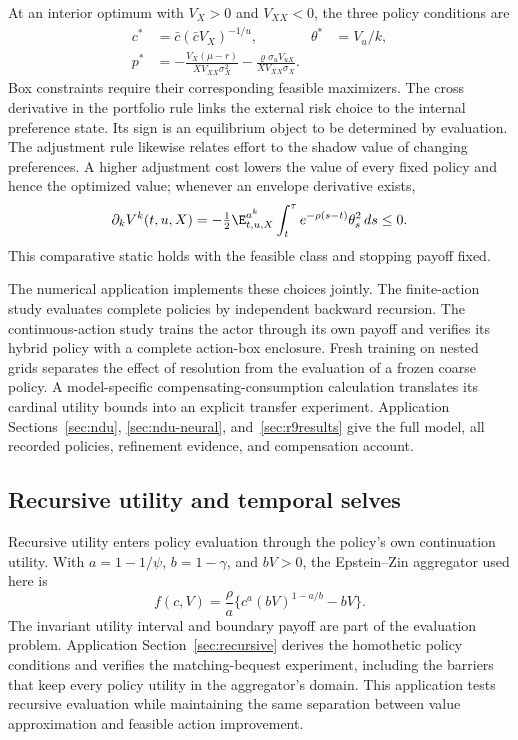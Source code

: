 At an interior optimum with $V_X>0$ and $V_{XX}<0$, the three policy conditions are
\begin{align}
 c^*&=\bar c(\bar c V_X)^{-1/u}, &
 \theta^*&=V_u/k,\nonumber\\
 p^*&=-\frac{V_X(\mu-r)}{XV_{XX}\sigma_X^2}
       -\frac{\varrho\sigma_u V_{uX}}{XV_{XX}\sigma_X}.\label{eq:scope-preference-policies}
\end{align}
Box constraints require their corresponding feasible maximizers. The cross derivative in the portfolio rule links the external risk choice to the internal preference state. Its sign is an equilibrium object to be determined by evaluation. The adjustment rule likewise relates effort to the shadow value of changing preferences. A higher adjustment cost lowers the value of every fixed policy and hence the optimized value; whenever an envelope derivative exists,
\begin{equation}\label{eq:scope-preference-envelope}
 \partial_k V^k(t,u,X)
 =-\tfrac12\E^{a^k}_{t,u,X}
   \int_t^\tau e^{-\rho(s-t)}\theta_s^2\,ds\leq0.
\end{equation}
This comparative static holds with the feasible class and stopping payoff fixed.

The numerical application implements these choices jointly. The finite-action study evaluates complete policies by independent backward recursion. The continuous-action study trains the actor through its own payoff and verifies its hybrid policy with a complete action-box enclosure. Fresh training on nested grids separates the effect of resolution from the evaluation of a frozen coarse policy. A model-specific compensating-consumption calculation translates its cardinal utility bounds into an explicit transfer experiment. Application Sections~\ref{sec:ndu}, \ref{sec:ndu-neural}, and~\ref{sec:r9results} give the full model, all recorded policies, refinement evidence, and compensation account.

\subsection{Recursive utility and temporal selves}
Recursive utility enters policy evaluation through the policy's own continuation utility. With $a=1-1/\psi$, $b=1-\gamma$, and $bV>0$, the Epstein--Zin aggregator used here is
\begin{equation}\label{eq:scope-recursive}
 f(c,V)=\frac\rho a\{c^a(bV)^{1-a/b}-bV\}.
\end{equation}
The invariant utility interval and boundary payoff are part of the evaluation problem. Application Section~\ref{sec:recursive} derives the homothetic policy conditions and verifies the matching-bequest experiment, including the barriers that keep every policy utility in the aggregator's domain. This application tests recursive evaluation while maintaining the same separation between value approximation and feasible action improvement.

